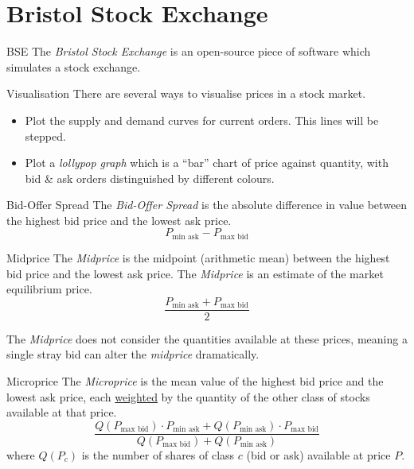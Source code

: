 \documentclass[11pt,a4paper]{article}
\begin{document}
\section{Bristol Stock Exchange}

\begin{remark}{BSE}
  The \textit{Bristol Stock Exchange} is an open-source piece of software which simulates a stock exchange.
\end{remark}

\begin{remark}{Visualisation}
  There are several ways to visualise prices in a stock market.
  \begin{itemize}
    \item Plot the supply and demand curves for current orders. This lines will be stepped.
    \item Plot a \textit{lollypop graph} which is a ``bar'' chart of price against quantity, with bid \& ask orders distinguished by different colours.
  \end{itemize}
\end{remark}

\begin{definition}{Bid-Offer Spread}
  The \textit{Bid-Offer Spread} is the absolute difference in value between the highest bid price and the lowest ask price.
  \[ P_\text{min ask}-P_\text{max bid} \]
\end{definition}

\begin{definition}{Midprice}
  The \textit{Midprice} is the midpoint (arithmetic mean) between the highest bid price and the lowest ask price. The \textit{Midprice} is an estimate of the market equilibrium price.
  \[ \frac{P_\text{min ask}+P_\text{max bid}}2 \]
  \par The \textit{Midprice} does not consider the quantities available at these prices, meaning a single stray bid can alter the \textit{midprice} dramatically.
\end{definition}

\begin{definition}{Microprice}
  The \textit{Microprice} is the mean value of the highest bid price and the lowest ask price, each \underline{weighted} by the quantity of the other class of stocks available at that price.
  \[ \frac{Q(P_\text{max bid})\cdot P_\text{min ask}+Q(P_\text{min ask})\cdot P_\text{max bid}}{Q(P_\text{max bid})+Q(P_\text{min ask})} \]
  where $Q(P_c)$ is the number of shares of class $c$ (bid or ask) available at price $P$.
\end{definition}
\end{document}

